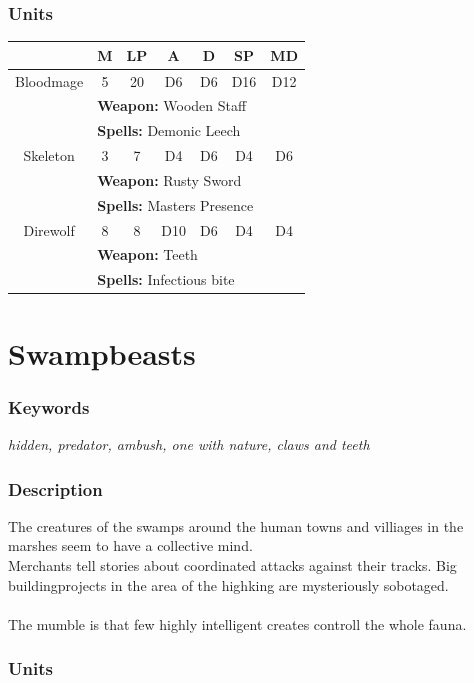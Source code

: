 \documentclass[a5paper,pagesize,10pt,bibtotoc,pointlessnumbers,
normalheadings,DIV=9,twoside=false]{scrbook}
\begin{document}
\subsubsection{Units}
 \begin{tabular}{||c c c c c c c||} 
 \hline
  & M & LP & A & D & SP & MD \\
 \hline\hline
 Bloodmage & 5 & 20 & D6 & D6 & D16 & D12 \\ 
  & \multicolumn{6}{l||}{\textbf{Weapon:} Wooden Staff} \\
  & \multicolumn{6}{l||}{\textbf{Spells:} Demonic Leech} \\
 \hline
 Skeleton & 3 & 7 & D4 & D6 & D4 & D6 \\
  & \multicolumn{6}{l||}{\textbf{Weapon:} Rusty Sword} \\
  & \multicolumn{6}{l||}{\textbf{Spells:} Masters Presence} \\
\hline
 Direwolf & 8 & 8 & D10 & D6 & D4 & D4 \\
  & \multicolumn{6}{l||}{\textbf{Weapon:} Teeth} \\
  & \multicolumn{6}{l||}{\textbf{Spells:} Infectious bite} \\
\hline
\end{tabular}

\newpage
\section{Swampbeasts}

\subsubsection{Keywords}
\emph{hidden, predator, ambush, one with nature, claws and teeth}

\subsubsection{Description}
The creatures of the swamps around the human towns and villiages in the marshes seem to have a collective mind.\\
Merchants tell stories about coordinated attacks against their tracks. Big buildingprojects in the area of the highking are mysteriously sobotaged.\\
\\
The mumble is that few highly intelligent creates controll the whole fauna.

\subsubsection{Units}
\end{document}
